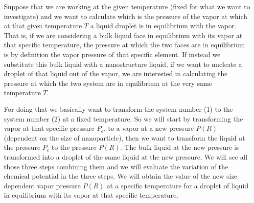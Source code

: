 \documentclass[../main/main.tex]{subfiles}
\begin{document}
Suppose that we are working  at the given temperature (fixed for what we want to investigate) and we want to calculate which is the pressure of the vapor at which at that given temperature \( T \) a liquid droplet is in equilibrium with the vapor. That is, if we are considering a bulk liquid face in equilibrium with its vapor at that specific temperature, the pressure at which the two faces are in equilibrium is by definition the vapor pressure of that specific element. If instead we substitute this bulk liquid with a nanostructure liquid, if we want to nucleate a droplet of that liquid out of the vapor, we are interested in calculating the pressure at which the two system are in equilibrium at the very same temperature \( T \).

For doing that we basically want to transform the system number (1) to the system number (2) at a fixed temperature. So we will start by transforming the vapor at that specific pressure \( P_e \), to a vapor at a new pressure \( P(R) \) (dependent on the size of nanoparticle), then we want to transform the liquid at the pressure \( P_e \) to the pressure \( P(R) \).  The bulk liquid at the new pressure is transformed into a droplet of the same liquid at the new pressure. We will see all those three steps combining them and we will evaluate the variation of the chemical potential in the three steps. We will obtain the value of the new size dependent vapor pressure \( P(R) \) at a specific temperature for a droplet of liquid in equilibrium with its vapor at that specific temperature.
\end{document}
